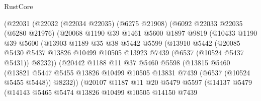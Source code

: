 \begin{lexlean}{RustCore}
\begin{coremodule}
                (@22031
                  (@22032
                    (@22034 @22035)
                    (@6275 @21908)
                    (@6092
                      @22033
                      @22035
                      (@6280 @21976)
                      (@20068
                        @1190
                        @39
                        @1461
                        @5600
                        @1897
                        @9819
                        (@10433
                          @1190
                          @39
                          @5600
                          (@13903
                            @1189
                            @35
                            @38
                            @5442
                            @5599
                            (@13910
                              @5442
                              (@20085
                                @5430
                                @5437
                                @13826
                                @10499
                                @10505
                                @13923
                                @7439
                                (@6537 (@10524 @5437 @5431))
                                @8232))
                            (@20442
                              @1188
                              @11
                              @37
                              @5460
                              @5598
                              (@13815
                                @5460
                                (@13821
                                  @5447
                                  @5455
                                  @13826
                                  @10499
                                  @10505
                                  @13831
                                  @7439
                                  (@6537 (@10524 @5455 @5448))
                                  @8232))
                              (@20107
                                @1187
                                @11
                                @20
                                @5479
                                @5597
                                (@14137
                                  @5479
                                  (@14143
                                    @5465
                                    @5474
                                    @13826
                                    @10499
                                    @10505
                                    @14150
                                    @7439

\end{coremodule}
\end{lexlean}
